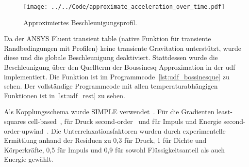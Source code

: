 \begin{figure}
  \centering
  \texttt{[image: ../../Code/approximate\_acceleration\_over\_time.pdf]}
  \caption{Approximiertes Beschleunigungsprofil.}\label{fig:approximierte_beschleunigung}
\end{figure}

Da der ANSYS Fluent transient table (native Funktion für transiente Randbedingungen mit Profilen) keine transiente Gravitation
unterstützt, wurde diese und die globale Beschleunigung deaktiviert.
Stattdessen wurde die Beschleunigung über den Quellterm der Boussinesq-Approximation in der \ac{udf} implementiert. Die Funktion ist im
Programmcode~\ref{lst:udf_bossinesque} zu sehen. Der vollständige Programmcode mit allen temperaturabhängigen Funktionen ist in \ref{lst:udf_rest} zu sehen.

Als Kopplungsschema wurde SIMPLE verwendet~\cite{akamcae-udf}. Für die Gradienten least-squares cell-based~\cite{akamcae-udf}, für Druck second-order~\cite{akamcae-udf} und für Impuls und Energie
second-order-upwind~\cite{akamcae-udf}. Die Unterrelaxationsfaktoren wurden durch experimentelle Ermittlung anhand der Residuen zu 0,3 für Druck, 1 für Dichte
und Körperkräfte, 0,5 für Impuls und 0,9 für sowohl Flüssigkeitsanteil als auch Energie gewählt.

